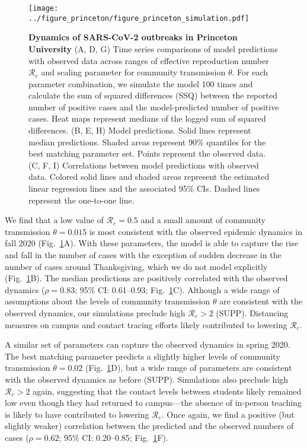 \documentclass[12pt]{article}
\newcommand{\fref}[1]{Fig.~\ref{fig:#1}}
\begin{document}
\begin{figure}[!th]
\texttt{[image: ../figure\_princeton/figure\_princeton\_simulation.pdf]}
\caption{
\textbf{Dynamics of SARS-CoV-2 outbreaks in Princeton University}
(A, D, G) Time series comparisons of model predictions with observed data across ranges of effective reproduction number $\mathcal R_e$ and scaling parameter for community transmission $\theta$.
For each parameter combination, we simulate the model 100 times and calculate the sum of squared differences (SSQ) between the reported number of positive cases and the model-predicted number of positive cases. 
Heat maps represent medians of the logged sum of squared differences.
(B, E, H) Model predictions. 
Solid lines represent median predictions.
Shaded areas represent 90\% quantiles for the best matching parameter set.
Points represent the observed data.
(C, F, I) Correlations between model predictions with observed data.
Colored solid lines and shaded areas represent the estimated linear regression lines and the associated 95\% CIs.
Dashed lines represent the one-to-one line.
\label{fig:matching}
}
\end{figure}

We find that a low value of $\mathcal R_e=0.5$ and a small amount of community transmission $\theta=0.015$ is most consistent with the observed epidemic dynamics in fall 2020 (\fref{matching}A).
With these parameters, the model is able to capture the rise and fall in the number of cases with the exception of sudden decrease in the number of cases around Thanksgiving, which we do not model explicitly (\fref{matching}B).
The median predictions are positively correlated with the observed dynamics ($\rho = 0.83$; 95\% CI: 0.61--0.93; \fref{matching}C).
Although a wide range of assumptions about the levels of community transmission $\theta$ are consistent with the observed dynamics, our simulations preclude high $\mathcal R_e > 2$ (SUPP).
Distancing measures on campus and contact tracing efforts likely contributed to lowering $\mathcal R_e$.

A similar set of parameters can capture the observed dynamics in spring 2020.
The best matching parameter predicts a slightly higher levels of community transmission $\theta=0.02$ (\fref{matching}D), but a wide range of parameters are consistent with the observed dynamics as before (SUPP). 
Simulations also preclude high $\mathcal R_e > 2$ again, suggesting that the contact levels between students likely remained low even though they had returned to campus---the absence of in-person teaching is likely to have contributed to lowering $\mathcal R_e$.
Once again, we find a positive (but slightly weaker) correlation between the predicted and the observed numbers of cases ($\rho = 0.62$; 95\% CI: 0.20--0.85; \fref{matching}F).
\end{document}
